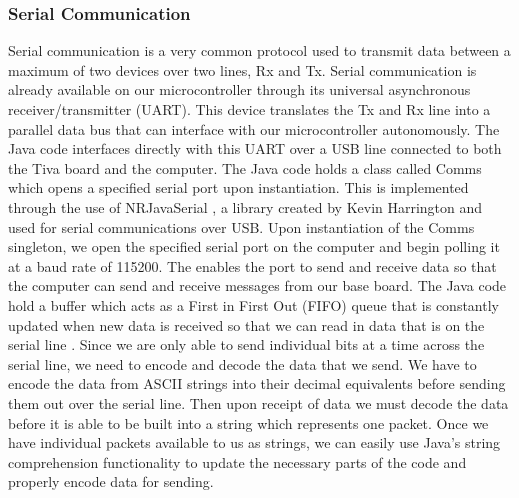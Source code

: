 \subsubsection{Serial Communication}
Serial communication is a very common protocol used to transmit data between a maximum of two devices over two lines, Rx and Tx. Serial communication is already available on our microcontroller through its universal asynchronous receiver/transmitter (UART). This device translates the Tx and Rx line into a parallel data bus that can interface with our microcontroller autonomously. The Java code interfaces directly with this UART over a USB line connected to both the Tiva board and the computer. The Java code holds a class called Comms which opens a specified serial port upon instantiation. This is implemented through the use of NRJavaSerial \cite{NRJavaSerial}, a library created by Kevin Harrington and used for serial communications over USB. Upon instantiation of the Comms singleton, we open the specified serial port on the computer and begin polling it at a baud rate of 115200. The enables the port to send and receive data so that the computer can send and receive messages from our base board. The Java code hold a buffer which acts as a First in First Out (FIFO) queue that is constantly updated when new data is received so that we can read in data that is on the serial line \cite{SerialSparkfun}.
Since we are only able to send individual bits at a time across the serial line, we need to encode and decode the data that we send.  We have to encode the data from ASCII strings into their decimal equivalents before sending them out over the serial line. Then upon receipt of data we must decode the data before it is able to be built into a string which represents one packet. Once we have individual packets available to us as strings, we can easily use Java's string comprehension functionality to update the necessary parts of the code and properly encode data for sending\cite{SerialSparkfun}.

